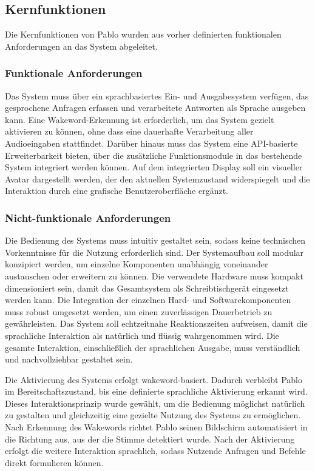 \subsection{Kernfunktionen}
Die Kernfunktionen von Pablo wurden aus vorher definierten funktionalen Anforderungen an das System abgeleitet. 

\subsubsection{Funktionale Anforderungen}

Das System muss über ein sprachbasiertes Ein- und Ausgabesystem verfügen, das gesprochene Anfragen erfassen und verarbeitete Antworten als Sprache ausgeben kann.
Eine Wakeword-Erkennung ist erforderlich, um das System gezielt aktivieren zu können, ohne dass eine dauerhafte Verarbeitung aller Audioeingaben stattfindet.
Darüber hinaus muss das System eine API-basierte Erweiterbarkeit bieten, über die zusätzliche Funktionsmodule in das bestehende System integriert werden können.
Auf dem integrierten Display soll ein visueller Avatar dargestellt werden, der den aktuellen Systemzustand widerspiegelt und die Interaktion durch eine grafische Benutzeroberfläche ergänzt.

\subsubsection{Nicht-funktionale Anforderungen}

Die Bedienung des Systems muss intuitiv gestaltet sein, sodass keine technischen Vorkenntnisse für die Nutzung erforderlich sind.
Der Systemaufbau soll modular konzipiert werden, um einzelne Komponenten unabhängig voneinander austauschen oder erweitern zu können.
Die verwendete Hardware muss kompakt dimensioniert sein, damit das Gesamtsystem als Schreibtischgerät eingesetzt werden kann.
Die Integration der einzelnen Hard- und Softwarekomponenten muss robust umgesetzt werden, um einen zuverlässigen Dauerbetrieb zu gewährleisten.
Das System soll echtzeitnahe Reaktionszeiten aufweisen, damit die sprachliche Interaktion als natürlich und flüssig wahrgenommen wird.
Die gesamte Interaktion, einschließlich der sprachlichen Ausgabe, muss verständlich und nachvollziehbar gestaltet sein.




Die Aktivierung des Systems erfolgt wakeword-basiert. 
Dadurch verbleibt Pablo im Bereitschaftszustand, bis eine definierte sprachliche Aktivierung erkannt wird. 
Dieses Interaktionsprinzip wurde gewählt, um die Bedienung möglichst natürlich zu gestalten und gleichzeitig eine gezielte Nutzung des Systems zu ermöglichen. 
Nach Erkennung des Wakewords richtet Pablo seinen Bildschirm automatisiert in die Richtung aus, aus der die Stimme detektiert wurde. 
Nach der Aktivierung erfolgt die weitere Interaktion sprachlich, sodass Nutzende Anfragen und Befehle direkt formulieren können.

